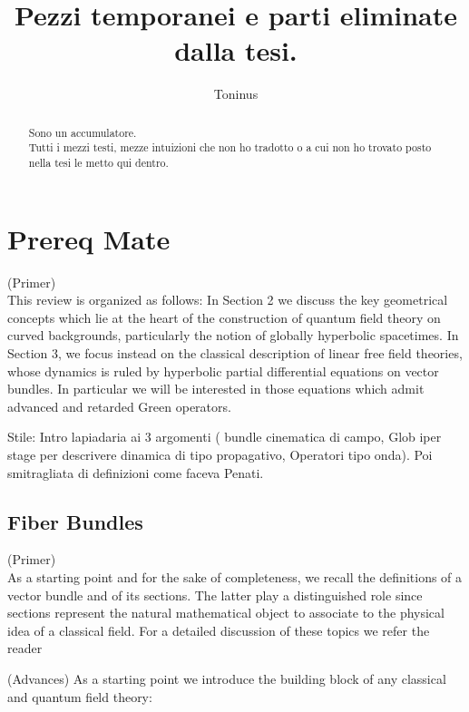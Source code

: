 \documentclass[Main]{subfiles}
\title{Pezzi temporanei e parti eliminate dalla tesi. }
\author{Toninus}
\begin{document}
\maketitle
\begin{abstract}
	Sono un accumulatore.\\
	Tutti i mezzi testi, mezze intuizioni che non ho tradotto o a cui non ho trovato posto nella tesi le metto qui dentro.\\
\end{abstract}
\tableofcontents

\chapter{Prereq Mate}

	\begin{Warning}
	(Primer)\\
	This review is organized as follows: In Section 2 we discuss the key geometrical concepts which lie
at the heart of the construction of quantum field theory on curved backgrounds, particularly the notion of globally hyperbolic spacetimes. In Section 3, we focus instead on the classical description of linear free field theories, whose dynamics is ruled by hyperbolic partial differential equations on vector bundles. In particular we will be interested in those equations which admit advanced and retarded Green operators.
	\end{Warning}	
	\begin{Warning}
		Stile: Intro lapiadaria ai 3 argomenti ( bundle cinematica di campo, Glob iper stage per descrivere dinamica di tipo propagativo, Operatori tipo onda). Poi smitragliata di definizioni come faceva Penati.
	\end{Warning}	
	



	\section{Fiber Bundles}
	\begin{Warning}
	(Primer)\\
	As a starting point and for the sake of completeness, we recall the definitions of a vector bundle and of
its sections. The latter play a distinguished role since sections represent the natural mathematical object to associate to the physical idea of a classical field. For a detailed discussion of these topics we refer the reader
	\end{Warning}
	\begin{Warning}
	(Advances)
	As a starting point we introduce the building block of any classical and quantum field theory:
	\end{Warning}
	
\end{document}
